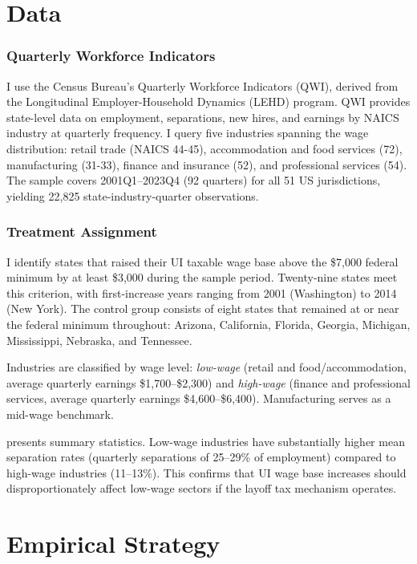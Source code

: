 \documentclass[12pt]{article}
\begin{document}
\section{Data}

\subsubsection*{Quarterly Workforce Indicators}
I use the Census Bureau's Quarterly Workforce Indicators (QWI), derived from the Longitudinal Employer-Household Dynamics (LEHD) program. QWI provides state-level data on employment, separations, new hires, and earnings by NAICS industry at quarterly frequency. I query five industries spanning the wage distribution: retail trade (NAICS 44-45), accommodation and food services (72), manufacturing (31-33), finance and insurance (52), and professional services (54). The sample covers 2001Q1--2023Q4 (92 quarters) for all 51 US jurisdictions, yielding 22,825 state-industry-quarter observations.

\subsubsection*{Treatment Assignment}
I identify states that raised their UI taxable wage base above the \$7,000 federal minimum by at least \$3,000 during the sample period. Twenty-nine states meet this criterion, with first-increase years ranging from 2001 (Washington) to 2014 (New York). The control group consists of eight states that remained at or near the federal minimum throughout: Arizona, California, Florida, Georgia, Michigan, Mississippi, Nebraska, and Tennessee.

Industries are classified by wage level: \textit{low-wage} (retail and food/accommodation, average quarterly earnings \$1,700--\$2,300) and \textit{high-wage} (finance and professional services, average quarterly earnings \$4,600--\$6,400). Manufacturing serves as a mid-wage benchmark.



 presents summary statistics. Low-wage industries have substantially higher mean separation rates (quarterly separations of 25--29\% of employment) compared to high-wage industries (11--13\%). This confirms that UI wage base increases should disproportionately affect low-wage sectors if the layoff tax mechanism operates.


\section{Empirical Strategy}
\end{document}
